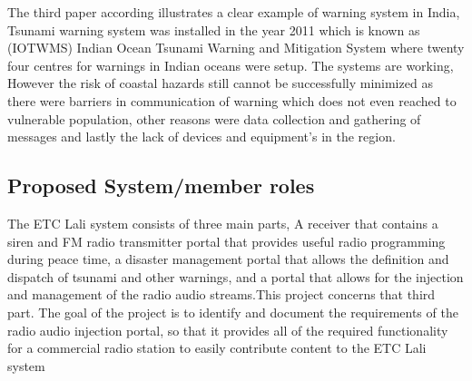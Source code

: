 The third paper according \cite{hemachandra2019regional} illustrates a clear example of warning system in India, Tsunami warning system was installed in the year 2011 which is known as (IOTWMS) Indian Ocean Tsunami Warning and Mitigation System where twenty four centres for warnings in Indian oceans were setup. The systems are working, However the risk of coastal hazards still cannot be successfully minimized as there were barriers in communication of warning which does not even reached to vulnerable population, other reasons were data collection and gathering of messages and lastly the lack of devices and equipment’s in the region. 
\subsection{Proposed System/member roles}
The ETC Lali system consists of three main parts, A receiver that contains a siren and FM radio transmitter portal that provides useful radio programming during peace time, a disaster management portal that allows the definition and dispatch of tsunami and other warnings, and a portal that allows for the injection and management of the radio audio streams.This project concerns that third part. The goal of the project is to identify and document the requirements of the radio audio injection portal, so that it provides all of the required functionality for a commercial radio station to easily contribute content to the ETC Lali system\\

